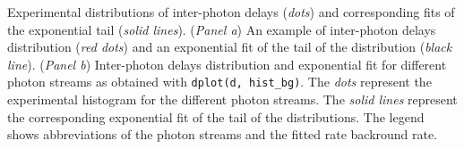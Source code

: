 \label{fig:bg_dist_all} Experimental distributions of inter-photon delays (\textit{dots}) and 
corresponding fits of the exponential tail (\textit{solid lines}). 
(\textit{Panel a}) An example of inter-photon delays distribution (\textit{red dots}) and an exponential fit 
of the tail of the distribution (\textit{black line}).
(\textit{Panel b}) Inter-photon delays distribution and exponential fit for different photon streams as obtained with \texttt{dplot(d, hist\_bg)}. The \textit{dots} represent the experimental histogram for the different photon streams. The \textit{solid lines} represent the corresponding exponential fit of the tail of the distributions. The legend shows abbreviations of the photon streams
and the fitted rate backround rate.